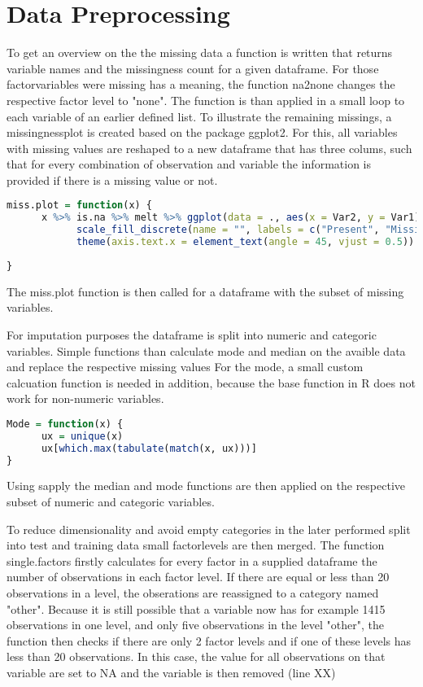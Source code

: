 \section{Data Preprocessing}

To  get an overview on the  the missing data a function is written that returns variable names and the missingness count for a given dataframe. 
For those factorvariables were missing has a meaning, the function na2none changes the respective factor level to "none". 
The function is than applied in a small loop to each variable of an earlier defined list. 
To illustrate the remaining missings, a  missingnessplot  is created based on the package ggplot2. For this, all variables with missing values are reshaped to a new dataframe that has three colums, such that for every combination of observation and variable the information is provided if there is a missing value or not. 

\begin{lstlisting}[language=R]
miss.plot = function(x) {
      x %>% is.na %>% melt %>% ggplot(data = ., aes(x = Var2, y = Var1)) + geom_raster(aes(fill = value)) + 
            scale_fill_discrete(name = "", labels = c("Present", "Missing")) + theme_minimal() + 
            theme(axis.text.x = element_text(angle = 45, vjust = 0.5)) + labs(x = "Variables in Dataset", 
                                                                              y = "Rows / observations")
}
\end{lstlisting}

The miss.plot function is then called  for  a dataframe with the subset of missing  variables. 

For imputation purposes the dataframe is split into numeric and categoric variables. 
Simple functions than calculate mode and median on the avaible data and replace the respective missing values
For the mode, a small custom calcuation function is needed in addition, because the base function in R does not work for non-numeric variables. 
\begin{lstlisting}[language=R]
Mode = function(x) {
      ux = unique(x)
      ux[which.max(tabulate(match(x, ux)))]
}
\end{lstlisting}
Using sapply the median and mode functions are then applied on the respective subset of numeric and categoric variables. 

To reduce dimensionality and avoid empty categories in the later performed split into test and training data small factorlevels are then merged. The function single.factors firstly calculates for every factor in a supplied dataframe the number of observations in each factor level. If there are equal or less than 20 observations in a level, the obserations are reassigned to a category named "other". 
Because it is still possible that a variable now has for example 1415 observations in one level, and only five observations in the level "other", the function then checks if there are only 2 factor levels and if one of these levels has less than 20 observations. In this case, the value for all observations on that variable are set to NA and the variable is then removed (line XX)

